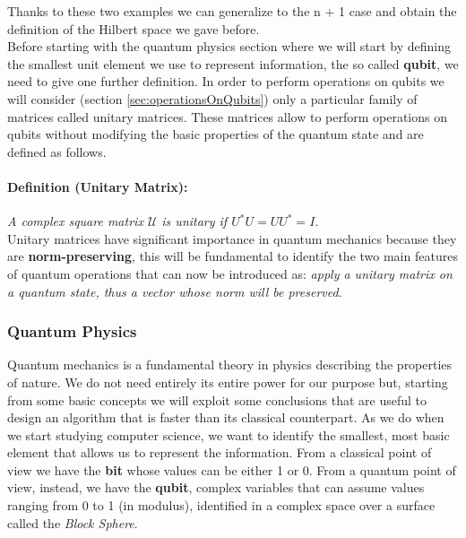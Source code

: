 \documentclass[english]{article}
\begin{document}
			Thanks to these two examples we can generalize to the n + 1 case and obtain the definition of the Hilbert space we gave before. \\
			
			Before starting with the quantum physics section where we will start by defining the smallest unit element we use to represent information, the so called \textbf{qubit}, we need to give one further definition. In order to perform operations on qubits we will consider (section \ref{sec:operationsOnQubits}) only a particular family of matrices called unitary matrices. These matrices allow to perform operations on qubits without modifying the basic properties of the quantum state and are defined as follows.
			
			\paragraph{Definition (Unitary Matrix):} \emph{A complex square matrix $\mathcal{U}$ is unitary if $U^{*}U = UU^{*} = I$.} \\
			
			Unitary matrices have significant importance in quantum mechanics because they are \textbf{norm-preserving}, this will be fundamental to identify the two main features of quantum operations that can now be introduced as: \emph{apply a unitary matrix on a quantum state, thus a vector whose norm will be preserved}.
						
			\subsubsection{Quantum Physics}
			\label{sec:quantumMechanics}
				Quantum mechanics is a fundamental theory in physics describing the properties of nature. We do not need entirely its entire power for our purpose but, starting from some basic concepts we will exploit some conclusions that are useful to design an algorithm that is faster than its classical counterpart. As we do when we start studying computer science, we want to identify the smallest, most basic element that allows us to represent the information. From a classical point of view we have the \textbf{bit} whose values can be either 1 or 0. From a quantum point of view, instead, we have the \textbf{qubit}, complex variables that can assume values ranging from 0 to 1 (in modulus), identified in a complex space over a surface called the \emph{Block Sphere}.
				
\end{document}
